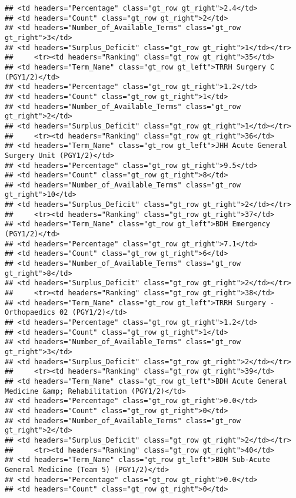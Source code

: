 \documentclass[
]{article}
\begin{document}
\begin{verbatim}
## <td headers="Percentage" class="gt_row gt_right">2.4</td>
## <td headers="Count" class="gt_row gt_right">2</td>
## <td headers="Number_of_Available_Terms" class="gt_row gt_right">3</td>
## <td headers="Surplus_Deficit" class="gt_row gt_right">1</td></tr>
##     <tr><td headers="Ranking" class="gt_row gt_right">35</td>
## <td headers="Term_Name" class="gt_row gt_left">TRRH Surgery C (PGY1/2)</td>
## <td headers="Percentage" class="gt_row gt_right">1.2</td>
## <td headers="Count" class="gt_row gt_right">1</td>
## <td headers="Number_of_Available_Terms" class="gt_row gt_right">2</td>
## <td headers="Surplus_Deficit" class="gt_row gt_right">1</td></tr>
##     <tr><td headers="Ranking" class="gt_row gt_right">36</td>
## <td headers="Term_Name" class="gt_row gt_left">JHH Acute General Surgery Unit (PGY1/2)</td>
## <td headers="Percentage" class="gt_row gt_right">9.5</td>
## <td headers="Count" class="gt_row gt_right">8</td>
## <td headers="Number_of_Available_Terms" class="gt_row gt_right">10</td>
## <td headers="Surplus_Deficit" class="gt_row gt_right">2</td></tr>
##     <tr><td headers="Ranking" class="gt_row gt_right">37</td>
## <td headers="Term_Name" class="gt_row gt_left">BDH Emergency (PGY1/2)</td>
## <td headers="Percentage" class="gt_row gt_right">7.1</td>
## <td headers="Count" class="gt_row gt_right">6</td>
## <td headers="Number_of_Available_Terms" class="gt_row gt_right">8</td>
## <td headers="Surplus_Deficit" class="gt_row gt_right">2</td></tr>
##     <tr><td headers="Ranking" class="gt_row gt_right">38</td>
## <td headers="Term_Name" class="gt_row gt_left">TRRH Surgery - Orthopaedics 02 (PGY1/2)</td>
## <td headers="Percentage" class="gt_row gt_right">1.2</td>
## <td headers="Count" class="gt_row gt_right">1</td>
## <td headers="Number_of_Available_Terms" class="gt_row gt_right">3</td>
## <td headers="Surplus_Deficit" class="gt_row gt_right">2</td></tr>
##     <tr><td headers="Ranking" class="gt_row gt_right">39</td>
## <td headers="Term_Name" class="gt_row gt_left">BDH Acute General Medicine &amp; Rehabilitation (PGY1/2)</td>
## <td headers="Percentage" class="gt_row gt_right">0.0</td>
## <td headers="Count" class="gt_row gt_right">0</td>
## <td headers="Number_of_Available_Terms" class="gt_row gt_right">2</td>
## <td headers="Surplus_Deficit" class="gt_row gt_right">2</td></tr>
##     <tr><td headers="Ranking" class="gt_row gt_right">40</td>
## <td headers="Term_Name" class="gt_row gt_left">BDH Sub-Acute General Medicine (Team 5) (PGY1/2)</td>
## <td headers="Percentage" class="gt_row gt_right">0.0</td>
## <td headers="Count" class="gt_row gt_right">0</td>

\end{verbatim}
\end{document}
